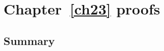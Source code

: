 \chapter{Chapter~\ref{ch23} proofs}

\newpage
\section{Summary}\label{ch23.ps.summary}
\lpscriptsummary
